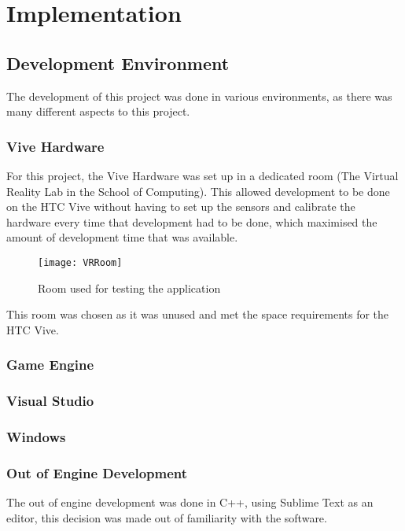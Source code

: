 \chapter{Implementation}
\label{chapter6}

\section{Development Environment}
The development of this project was done in various environments, as there was many different aspects to this project.

\subsection{Vive Hardware}
	For this project, the Vive Hardware was set up in a dedicated room (The Virtual Reality Lab in the School of Computing). This allowed development to be done on the HTC Vive without having to set up the sensors and calibrate the hardware every time that development had to be done, which maximised the amount of development time that was available.\\

\begin{figure}[H]
	\texttt{[image: VRRoom]}
	\centering
	\caption{Room used for testing the application}
	\label{fig:VRRoom}
\end{figure}

	This room was chosen as it was unused and met the space requirements for the HTC Vive.

\subsection{Game Engine}
\lipsum[1-1] \cite{parikh1980adaptive}

\subsection{Visual Studio}

\subsection{Windows}

\subsection{Out of Engine Development}
	The out of engine development was done in C++, using Sublime Text as an editor, this decision was made out of familiarity with the software.

